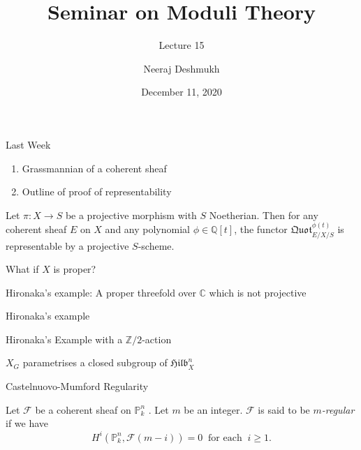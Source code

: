 \documentclass[ignorenonframetext,t]{beamer}
\title[Moduli@IISERP]{Seminar on Moduli Theory}
\subtitle{Lecture 15}
\author{Neeraj Deshmukh}
\date{December 11, 2020}
\newcommand{\sF}{{\mathcal F}}
\newcommand{\C}{{\mathbb C}}
\renewcommand{\P}{{\mathbb P}}
\newcommand{\Q}{{\mathbb Q}}
\newcommand{\Z}{{\mathbb Z}}
\theoremstyle{definition}
\begin{document}
	
	
\begin{frame}
\titlepage
\end{frame}

\begin{frame}{Last Week}
\begin{enumerate}
	\item Grassmannian of a coherent sheaf
	\item Outline of proof of representability
\end{enumerate}
\end{frame}

\begin{frame}

\end{frame}


\begin{frame}
	\begin{theorem}[Grothendieck]
		\label{theorem-quot-representable}
		Let $\pi: X\rightarrow S$ be a projective morphism with $S$ Noetherian. Then for any coherent sheaf $E$ on $X$ and any polynomial $\phi \in \Q[t]$, the functor $\mathfrak{Quot}^{\phi(t)}_{E/X/S}$ is representable by a projective $S$-scheme.
	\end{theorem}
	What if $X$ is proper?
	
\end{frame}

\begin{frame}
	Hironaka's example:	A proper threefold over $\C$ which is not projective
\end{frame}

\begin{frame}
	Hironaka's example
\end{frame}

\begin{frame}
	Hironaka's Example with a $\Z/2$-action
\end{frame}

\begin{frame}
	$X_G$ parametrises a closed subgroup of $\mathfrak{Hilb}^n_X$
\end{frame}


\begin{frame}
	Castelnuovo-Mumford Regularity
\begin{definition}
	Let $\sF$ be a coherent sheaf on $\P_k^n$ . Let $m$ be an integer. $\sF$ is said to be \textit{$m$-regular} if we have
	\[H^i(\P^n_k,\sF(m-i))=0 \;\;\text{for each}\;\; i\geq 1.\]
\end{definition}
\end{frame}
\end{document}

